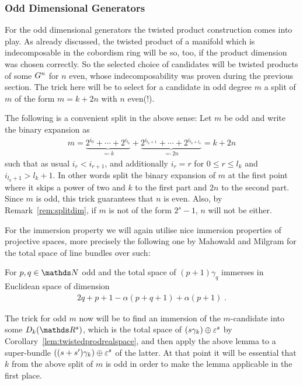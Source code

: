 \subsubsection{Odd Dimensional Generators}
For the odd dimensional generators the twisted product construction
comes into play.
As already discussed, the twisted product of a manifold which is
indecomposable in the cobordism ring will be so, too, if the product
dimension was chosen correctly. So the selected choice of candidates
will be twisted products of some $G^{n}$ for $n$ even, whose
indecomposability was proven during the previous section.
The trick here will be to select for a candidate in odd degree $m$ a
split of $m$ of the form $m=k+2n$ with $n$ even(!).
\begin{Rem}\label{rem:splitodddimension}
  The following is a convenient split in the above sense:
  Let $m$ be odd and write the binary expansion as 
  \begin{gather*}
    m
    = \underbrace{2^{i_0} + \dotsb + 2^{i_{l_k}}}_{\eqqcolon k}
    + \underbrace{2^{i_{l_k+1}}
      + \dotsb + 2^{i_{l_k+l_n}}}_{\eqqcolon 2n}
    = k+2n
  \end{gather*}
  such that as usual $i_r<i_{r+1}$, and additionally $i_r=r$ for
  $0\leq r\leq l_k$ and $i_{l_k+1} > l_k+1$.
  In other words split the binary expansion of $m$ at the first point
  where it skips a power of two and $k$ to the first part and $2n$ to
  the second part. Since $m$ is odd, this trick guarantees that $n$ is
  even. Also, by Remark~\ref{rem:splitdim},
  if $m$ is not of the form $2^s-1$, $n$ will not be either.
\end{Rem}

For the immersion property we will again utilise nice immersion
properties of projective spaces, more precisely the following one by
Mahowald and Milgram for the total space of line bundles over such:
\begin{Lem}
  \label{lem:immersionuniversalbdl}
  For $p,q\in\Nat$ odd and the total space of $(p+1)\gamma_q$ immerses
  in Euclidean space of dimension
  \begin{gather*}
    2q+p+1-\alpha(p+q+1)+\alpha(p+1)
    \;.
  \end{gather*}
\end{Lem}
The trick for odd $m$ now will be to find an immersion of the
$m$-candidate into some $\Twistedprod{k}{\R^{s}}$, which is
the total space of $(s\gamma_k)\oplus\varepsilon^s$
by Corollary~\ref{lem:twistedprodrealspace}, and then apply the above
lemma to a super-bundle $((s+s')\gamma_k)\oplus\varepsilon^s$ of
the latter.
At that point it will be essential that $k$ from the above split of
$m$ is odd in order to make the lemma applicable in the first
place.

